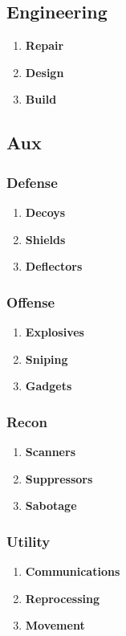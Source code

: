 \subsection{Engineering}\label{subsec:engineering}
\begin{enumerate}[label= -]
    \item \textbf{Repair} 
    \item \textbf{Design} 
    \item \textbf{Build} 
\end{enumerate}
\subsection{Aux}\label{subsec:aux}
\subsubsection{Defense}
\begin{enumerate}[label= -]
    \item \textbf{Decoys}
    \item \textbf{Shields}
    \item \textbf{Deflectors}
\end{enumerate}
\subsubsection{Offense}
\begin{enumerate}[label= -]
    \item \textbf{Explosives}
    \item \textbf{Sniping}
    \item \textbf{Gadgets}
\end{enumerate}
\subsubsection{Recon}
\begin{enumerate}[label= -]
    \item \textbf{Scanners}
    \item \textbf{Suppressors}
    \item \textbf{Sabotage}
\end{enumerate}
\subsubsection{Utility}
\begin{enumerate}[label= -]
    \item \textbf{Communications}
    \item \textbf{Reprocessing}
    \item \textbf{Movement}
\end{enumerate}
